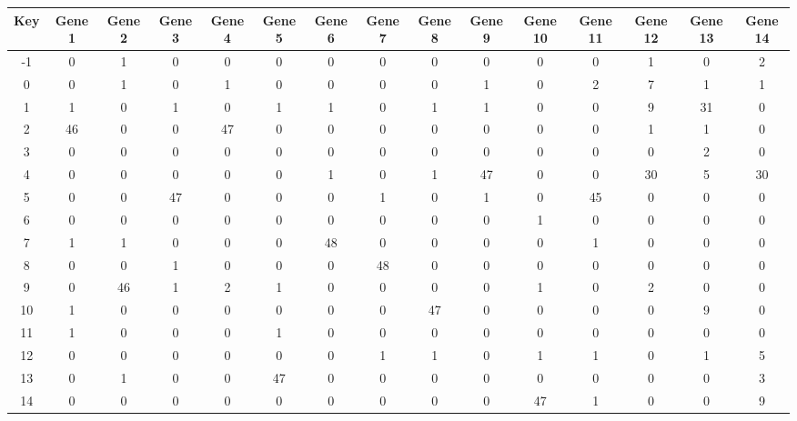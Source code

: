 \begin{tabular}{|c|c|c|c|c|c|c|c|c|c|c|c|c|c|c|}
\hline
Key & Gene 1 & Gene 2 & Gene 3 & Gene 4 & Gene 5 & Gene 6 & Gene 7 & Gene 8 & Gene 9 & Gene 10 & Gene 11 & Gene 12 & Gene 13 & Gene 14 \\
\hline
-1 & 0 & 1 & 0 & 0 & 0 & 0 & 0 & 0 & 0 & 0 & 0 & 1 & 0 & 2 \\
0 & 0 & 1 & 0 & 1 & 0 & 0 & 0 & 0 & 1 & 0 & 2 & 7 & 1 & 1 \\
1 & 1 & 0 & 1 & 0 & 1 & 1 & 0 & 1 & 1 & 0 & 0 & 9 & 31 & 0 \\
2 & 46 & 0 & 0 & 47 & 0 & 0 & 0 & 0 & 0 & 0 & 0 & 1 & 1 & 0 \\
3 & 0 & 0 & 0 & 0 & 0 & 0 & 0 & 0 & 0 & 0 & 0 & 0 & 2 & 0 \\
4 & 0 & 0 & 0 & 0 & 0 & 1 & 0 & 1 & 47 & 0 & 0 & 30 & 5 & 30 \\
5 & 0 & 0 & 47 & 0 & 0 & 0 & 1 & 0 & 1 & 0 & 45 & 0 & 0 & 0 \\
6 & 0 & 0 & 0 & 0 & 0 & 0 & 0 & 0 & 0 & 1 & 0 & 0 & 0 & 0 \\
7 & 1 & 1 & 0 & 0 & 0 & 48 & 0 & 0 & 0 & 0 & 1 & 0 & 0 & 0 \\
8 & 0 & 0 & 1 & 0 & 0 & 0 & 48 & 0 & 0 & 0 & 0 & 0 & 0 & 0 \\
9 & 0 & 46 & 1 & 2 & 1 & 0 & 0 & 0 & 0 & 1 & 0 & 2 & 0 & 0 \\
10 & 1 & 0 & 0 & 0 & 0 & 0 & 0 & 47 & 0 & 0 & 0 & 0 & 9 & 0 \\
11 & 1 & 0 & 0 & 0 & 1 & 0 & 0 & 0 & 0 & 0 & 0 & 0 & 0 & 0 \\
12 & 0 & 0 & 0 & 0 & 0 & 0 & 1 & 1 & 0 & 1 & 1 & 0 & 1 & 5 \\
13 & 0 & 1 & 0 & 0 & 47 & 0 & 0 & 0 & 0 & 0 & 0 & 0 & 0 & 3 \\
14 & 0 & 0 & 0 & 0 & 0 & 0 & 0 & 0 & 0 & 47 & 1 & 0 & 0 & 9 \\
\hline
\end{tabular}